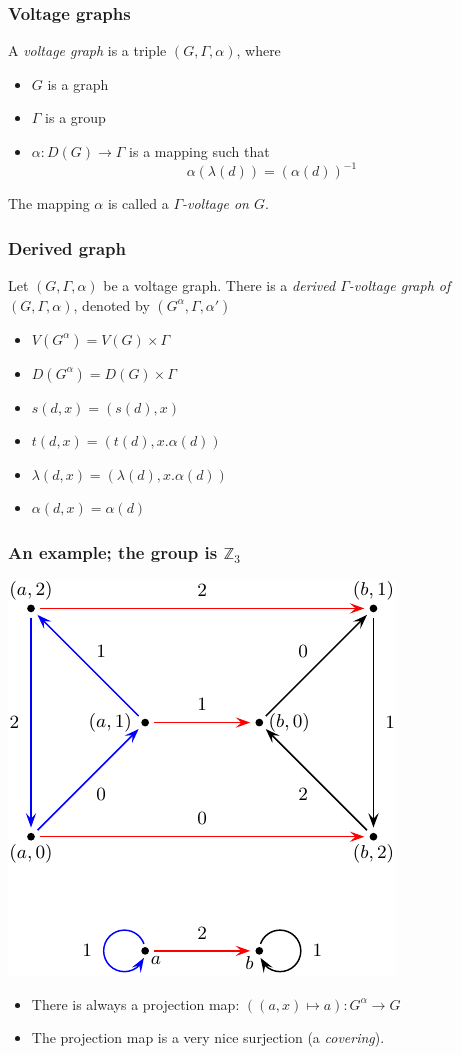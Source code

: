\documentclass{beamer}
\begin{document}
\begin{frame}
\frametitle{Voltage graphs}

A {\em voltage graph} is a triple $(G,Γ,α)$,
where 
\begin{itemize}
\item $G$ is a graph
\item $Γ$ is a group
\item $α\colon D(G)\to Γ$ is a mapping such that 
$$α(λ(d))=(α(d))^{-1}$$
\end{itemize}
The mapping $α$ is called a {\em $Γ$-voltage on $G$}.
\end{frame}
\begin{frame}
\frametitle{Derived graph}
\begin{definition}\cite{gross2001topological}
\label{def:derived} 
Let $(G,Γ,α)$ be a voltage graph. There is a {\em derived $Γ$-voltage graph of
$(G,Γ,α)$},
denoted by $(G^α,Γ,α')$
\begin{itemize}
\item $V(G^α)=V(G)×Γ$
\item $D(G^α)=D(G)×Γ$
\item $s(d,x)=(s(d),x)$
\item $t(d,x)=(t(d),x.α(d))$
\item $λ(d,x)=(λ(d),x.α(d))$
\item $α(d,x)=α(d)$
\end{itemize}
\end{definition}
\end{frame}
\begin{frame}
\frametitle{An example; the group is $\mathbb Z_3$}
\begin{center}
\includegraphics[scale=0.8]{derived1}
\end{center}
\begin{itemize}
\item There is always a projection map: $((a,x)\mapsto a)\colon G^α\to G$
\item The projection map is a very nice surjection (a {\em covering}).
\end{itemize}
\end{frame}
\end{document}
